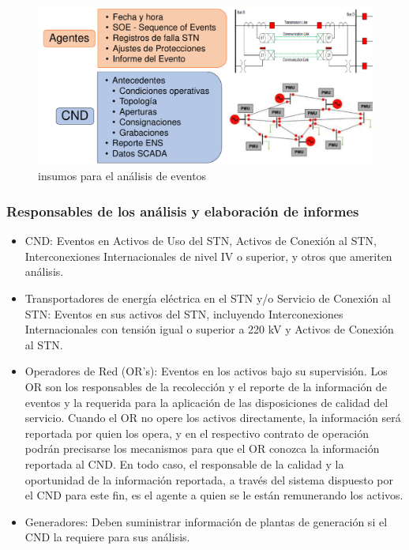 \documentclass[a5paper]{book}%
\begin{document}
\begin{figure}[H]
	\centering
	\caption{insumos para el análisis de eventos}
	\label{fig:insumoseventos}
	\includegraphics[width=0.8\linewidth]{insumos_eventos}
\end{figure}

\subsubsection{Responsables de los análisis y elaboración de informes}

\begin{itemize}
	
	\item CND: Eventos en Activos de Uso del STN, Activos de Conexión al STN, Interconexiones Internacionales de nivel IV o superior, y otros que ameriten análisis.
	
	\item Transportadores de energía eléctrica en el \ac{STN} y/o Servicio de Conexión al \ac{STN}: Eventos en sus activos del \ac{STN}, incluyendo Interconexiones Internacionales con tensión igual o superior a 220 kV y Activos de Conexión al \ac{STN}.
	
	\item Operadores de Red (OR's): Eventos en los activos bajo su supervisión. Los OR son los responsables de la recolección y el reporte de la información de eventos y la requerida para la aplicación de las disposiciones de calidad del servicio. Cuando el OR no opere los activos directamente, la información será reportada por quien los opera, y en el respectivo contrato de operación podrán precisarse los mecanismos para que el OR conozca la información reportada al CND. En todo caso, el responsable de la calidad y la oportunidad de la información reportada, a través del sistema dispuesto por el CND para este fin, es el agente a quien se le están remunerando los activos.
	
	\item Generadores: Deben suministrar información de plantas de generación si el \ac{CND} la requiere para sus análisis.
	
\end{itemize}
\end{document}
